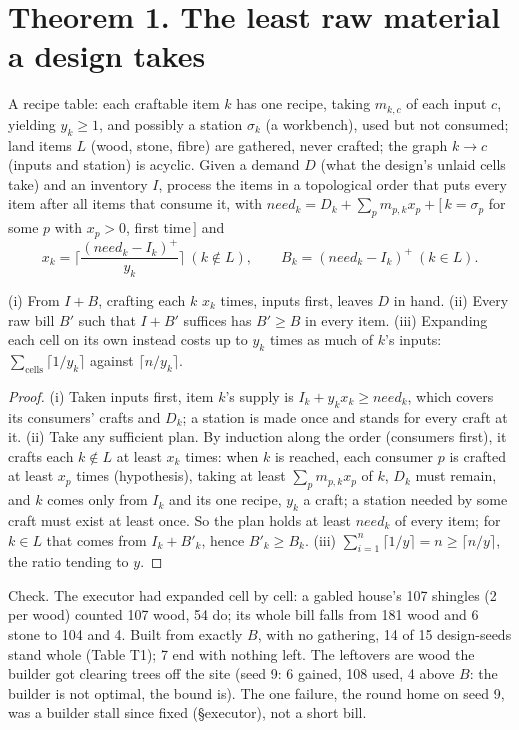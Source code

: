 \section*{Theorem 1. The least raw material a design takes}
A recipe table: each craftable item $k$ has one recipe, taking $m_{k,c}$ of each input $c$, yielding $y_k\ge1$, and
possibly a station $\sigma_k$ (a workbench), used but not consumed; land items $L$ (wood, stone, fibre) are gathered,
never crafted; the graph $k\to c$ (inputs and station) is acyclic. Given a demand $D$ (what the design's unlaid cells
take) and an inventory $I$, process the items in a topological order that puts every item after all items that consume
it, with $\mathit{need}_k=D_k+\sum_p m_{p,k}x_p+[\,k=\sigma_p$ for some $p$ with $x_p>0$, first time$\,]$ and
$$x_k=\Big\lceil\frac{(\mathit{need}_k-I_k)^+}{y_k}\Big\rceil\ (k\notin L),\qquad B_k=(\mathit{need}_k-I_k)^+\ (k\in L).$$
\begin{theorem} (i) From $I+B$, crafting each $k$ $x_k$ times, inputs first, leaves $D$ in hand. (ii) Every raw bill
$B'$ such that $I+B'$ suffices has $B'\ge B$ in every item. (iii) Expanding each cell on its own instead costs up to
$y_k$ times as much of $k$'s inputs: $\sum_{\text{cells}}\lceil 1/y_k\rceil$ against $\lceil n/y_k\rceil$.\end{theorem}
\begin{proof} (i) Taken inputs first, item $k$'s supply is $I_k+y_kx_k\ge\mathit{need}_k$, which covers its consumers'
crafts and $D_k$; a station is made once and stands for every craft at it. (ii) Take any sufficient plan. By
induction along the order (consumers first), it crafts each $k\notin L$ at least $x_k$ times: when $k$ is reached,
each consumer $p$ is crafted at least $x_p$ times (hypothesis), taking at least $\sum_pm_{p,k}x_p$ of $k$, $D_k$ must
remain, and $k$ comes only from $I_k$ and its one recipe, $y_k$ a craft; a station needed by some craft must exist
at least once. So the plan holds at least $\mathit{need}_k$ of every item; for $k\in L$ that comes from $I_k+B'_k$,
hence $B'_k\ge B_k$. (iii) $\sum_{i=1}^n\lceil1/y\rceil=n\ge\lceil n/y\rceil$, the ratio tending to $y$.\end{proof}
\noindent Check. The executor had expanded cell by cell: a gabled house's 107 shingles (2 per wood) counted 107 wood,
54 do; its whole bill falls from 181 wood and 6 stone to 104 and 4. Built from exactly $B$, with no gathering, 14 of 15
design-seeds stand whole (Table T1); 7 end with nothing left. The leftovers are wood the builder got clearing trees
off the site (seed 9: 6 gained, 108 used, 4 above $B$: the builder is not optimal, the bound is). The one failure,
the round home on seed 9, was a builder stall since fixed (\S executor), not a short bill.

